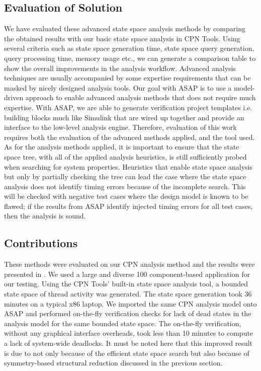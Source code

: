 \subsection{Evaluation of Solution}
We have evaluated these advanced state space analysis methods by comparing the obtained results with our basic state space analysis in CPN Tools. Using several criteria such as state space generation time, state space query generation, query processing time, memory usage etc., we can generate a comparison table to show the overall improvements in the analysis workflow. Advanced analysis techniques are usually accompanied by some expertise requirements that can be masked by nicely designed analysis tools. Our goal with ASAP is to use a model-driven approach to enable advanced analysis methods that does not require much expertise. With ASAP, we are able to generate verification project templates i.e. building blocks much like Simulink that are wired up together and provide an interface to the low-level analysis engine. Therefore, evaluation of this work requires both the evaluation of the advanced methods applied, and the tool used. As for the analysis methods applied, it is important to ensure that the state space tree, with all of the applied analysis heuristics, is still sufficiently probed when searching for system properties. Heuristics that enable state space analysis but only by partially checking the tree can lead the case where the state space analysis does not identify timing errors because of the incomplete search. This will be checked with negative test cases where the design model is known to be flawed; if the results from ASAP identify injected timing errors for all test cases, then the analysis is sound. 

\subsection{Contributions}
These methods were evaluated on our CPN analysis method and the results were presented in \cite{SEUS}. We used a large and diverse 100 component-based application for our testing. Using the CPN Tools' built-in state space analysis tool, a bounded state space of thread activity was generated. The state space generation took 36 minutes on a typical x86 laptop. We imported the same CPN analysis model onto ASAP and performed on-the-fly verification checks for lack of dead states in the analysis model for the same bounded state space. The on-the-fly verification, without any graphical interface overheads, took less than 10 minutes to compute a lack of system-wide deadlocks. It must be noted here that this improved result is due to not only because of the efficient state space search but also because of symmetry-based structural reduction discussed in the previous section.


